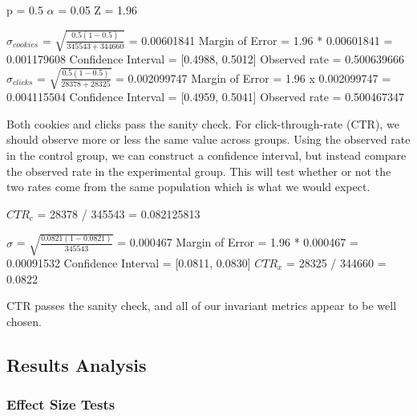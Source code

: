 \documentclass[paper=a4, fontsize=11pt]{scrartcl} %
\numberwithin{equation}{section} %
\numberwithin{figure}{section} %
\numberwithin{table}{section} %
\begin{document}
p = 0.5 \newline
$\alpha$ = 0.05 \newline
Z = 1.96
\newline

$\sigma_{cookies}$ = $\sqrt{\frac{0.5 (1 - 0.5)}{345543 + 344660}}$ = 0.00601841
\newline
Margin of Error = 1.96 * 0.00601841 = 0.001179608
\newline
Confidence Interval = [0.4988, 0.5012]
\newline
Observed rate = 0.500639666
\newline
\newline
$\sigma_{clicks}$ = $\sqrt{\frac{0.5 (1 - 0.5)}{28378 + 28325}}$ = 0.002099747
\newline
Margin of Error = 1.96 x 0.002099747 = 0.004115504
\newline
Confidence Interval = [0.4959, 0.5041]
\newline
Observed rate = 0.500467347
\newline

Both cookies and clicks pass the sanity check.  For click-through-rate (CTR), we should observe more or less the same value across groups.  Using the observed rate in the control group, we can construct a confidence interval, but instead compare the observed rate in the experimental group.  This will test whether or not the two rates come from the same population which is what we would expect.
\newline

$CTR_{c}$ = 28378 / 345543 = 0.082125813

$\sigma$ = $\sqrt{\frac{0.0821(1-0.0821)}{345543}}$ = 0.000467
\newline
Margin of Error = 1.96 * 0.000467 = 0.00091532
\newline
Confidence Interval = [0.0811, 0.0830]
\newline
$CTR_{x}$ = 28325 / 344660 = 0.0822
\newline

CTR passes the sanity check, and all of our invariant metrics appear to be well chosen. \newline


\subsection{Results Analysis}

\subsubsection{Effect Size Tests}
\end{document}
